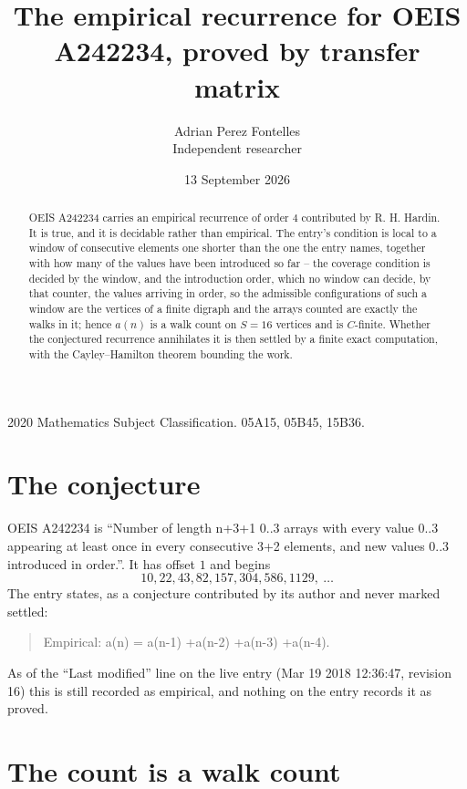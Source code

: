 \documentclass[11pt,a4paper]{article}
\title{The empirical recurrence for OEIS A242234, proved by transfer matrix}
\author{Adrian Perez Fontelles\\ \small Independent researcher}
\date{13 September 2026}
\theoremstyle{plain}
\theoremstyle{definition}
\begin{document}
\maketitle

\begin{abstract}
OEIS A242234 carries an empirical recurrence of order $4$ contributed by R. H. Hardin. It is
true, and it is decidable rather than empirical. The entry's condition is local to a window of consecutive elements one shorter than the one the entry names, together with how many of the values have been introduced so far -- the coverage condition is decided by the window, and the introduction order, which no window can decide, by that counter, the values arriving in order, so
the admissible configurations of such a window are the vertices of a finite digraph and the
arrays counted are exactly the walks in it; hence $a(n)$ is a walk count on $S=16$ vertices
and is $C$-finite. Whether the conjectured recurrence annihilates it is then settled by a
finite exact computation, with the Cayley--Hamilton theorem bounding the work.
\end{abstract}

\noindent\small 2020 Mathematics Subject Classification. 05A15, 05B45, 15B36.\normalsize

\section{The conjecture}

OEIS A242234 is ``Number of length n+3+1 0..3 arrays with every value 0..3 appearing at least once in every consecutive 3+2 elements, and new values 0..3 introduced in order.''. It has offset $1$ and begins
\[
10, 22, 43, 82, 157, 304, 586, 1129,\ \dots
\]
The entry states, as a conjecture contributed by its author and never marked settled:
\begin{quote}
Empirical: a(n) = a(n-1) +a(n-2) +a(n-3) +a(n-4).
\end{quote}
As of the ``Last modified'' line on the live entry (Mar 19 2018 12:36:47, revision 16) this is still
recorded as empirical, and nothing on the entry records it as proved.

\section{The count is a walk count}
\end{document}
